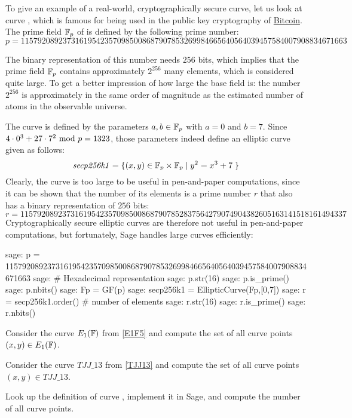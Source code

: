 \begin{example}\label{secp256k1}
To give an example of a real-world, cryptographically secure curve, let us look at curve , which is famous for being used in the public key cryptography of \href{https://bitcoin.org/}{Bitcoin}. The prime field $\mathbb{F}_p$ of  is defined by the following prime number:
$$
p = \scriptstyle 115792089237316195423570985008687907853269984665640564039457584007908834671663
$$
 
 The binary representation of this number needs $256$ bits, which implies that the prime field $\mathbb{F}_p$  contains approximately $2^{256}$ many elements, which is considered quite large. To get a better impression of how large the base field is: the number $2^{256}$ is approximately in the same order of magnitude as the estimated number of atoms in the observable universe. 

The curve  is defined by the parameters $a,b\in \mathbb{F}_p$ with $a=0$ and $b=7$. Since $4\cdot 0^3 + 27\cdot 7^2 \text{ mod } p=1323$, those parameters indeed define an elliptic curve given as follows:
$$
\mathit{secp256k1} = \{(x,y)\in \mathbb{F}_p\times \mathbb{F}_p \;|\; y^2 = x^3 +7\;\} 
$$
Clearly, the  curve is too large to be useful in pen-and-paper computations, since it can be shown that  the number of its elements is a prime number $r$ that also has a binary representation of $256$ bits:
$$
r = \scriptstyle 11579208923731619542357098500868790785283756427907490438260516
3141518161494337
$$
Cryptographically secure elliptic curves are therefore not useful in pen-and-paper computations, but fortunately, Sage handles large curves efficiently:
\begin{sagecommandline}
sage: p = 115792089237316195423570985008687907853269984665640564039457584007908834671663
sage: # Hexadecimal representation
sage: p.str(16)
sage: p.is_prime()
sage: p.nbits()
sage: Fp = GF(p)
sage: secp256k1 = EllipticCurve(Fp,[0,7])
sage: r = secp256k1.order() # number of elements
sage: r.str(16)
sage: r.is_prime()
sage: r.nbits()
\end{sagecommandline}
\end{example}
\begin{exercise} Consider the curve $E_1(\mathbb{F})$ from \examplename{} \ref{E1F5} and compute the set of all curve points $(x,y)\in E_1(\mathbb{F})$.
\end{exercise}
\begin{exercise} Consider the curve $TJJ\_13$ from \examplename{} \ref{TJJ13} and compute the set of all curve points $(x,y)\in TJJ\_13$.
\end{exercise}
\begin{exercise}
Look up the definition of curve , implement it in Sage, and compute the number of all curve points.
\end{exercise}
